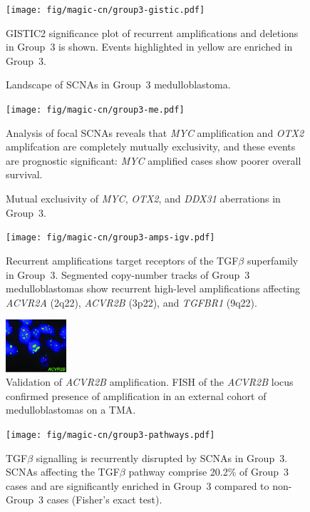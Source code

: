 \documentclass[11pt,letterpaper]{article}
\theoremstyle{definition}
\begin{document}
\clearpage

\begin{figure}[h]
	\begin{center}
		\texttt{[image: fig/magic-cn/group3-gistic.pdf]}
	\end{center}
	\caption{Landscape of SCNAs in Group~3 medulloblastoma.}
	GISTIC2 significance plot of recurrent amplifications and deletions in Group~3 is shown. Events highlighted in yellow are enriched in Group~3.
	\label{fig:group3-gistic}
\end{figure}

\clearpage

\begin{figure}[h]
	\begin{center}
		\texttt{[image: fig/magic-cn/group3-me.pdf]}
	\end{center}
	\caption{Mutual exclusivity of \emph{MYC}, \emph{OTX2}, and \emph{DDX31} aberrations in Group~3.}
	Analysis of focal SCNAs reveals that \emph{MYC} amplification and \emph{OTX2} amplifcation are completely mutually exclusivity, and these events are prognostic significant: \emph{MYC} amplified cases show poorer overall survival.
	\label{fig:group3-me}
\end{figure}

\begin{figure}
	\centering
	\texttt{[image: fig/magic-cn/group3-amps-igv.pdf]}
	\caption{Recurrent amplifications target receptors of the TGF$\beta$ superfamily in Group~3.
		Segmented copy-number tracks of Group~3 medulloblastomas show recurrent high-level amplifications affecting \emph{ACVR2A} (2q22), \emph{ACVR2B} (3p22), and \emph{TGFBR1} (9q22).}
	\label{fig:group3-amps-igv}
\end{figure}

\begin{figure}
	\centering
	\includegraphics[width=0.2\textwidth]{fig/magic-cn/acvr2b-fish.jpg}
	\caption{Validation of \emph{ACVR2B} amplification.
	FISH of the \emph{ACVR2B} locus confirmed presence of amplification in an external cohort of medulloblastomas on a TMA.}
	\label{fig:acvr2b-fish}
\end{figure}

\begin{figure}
	\centering
	\texttt{[image: fig/magic-cn/group3-pathways.pdf]}
	\caption{TGF$\beta$ signalling is recurrently disrupted by SCNAs in Group~3.
SCNAs affecting the TGF$\beta$ pathway comprise 20.2\% of Group~3 cases and are significantly enriched in Group~3 compared to non-Group~3 cases (Fisher’s exact test).}
	\label{fig:group3-pathways}
\end{figure}
\end{document}
